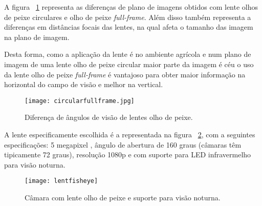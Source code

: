 A figura ~\ref{fig:circularfullframe} representa as diferenças de plano de imagens obtidos com lente olhos de peixe circulares e olho de peixe \textit{full-frame}. Além disso também representa a diferenças em distâncias focais das lentes, na qual afeta o tamanho das imagem na plano de imagem.


Desta forma, como a aplicação da lente é no ambiente agrícola e num plano de imagem de uma lente olho de peixe circular maior parte da imagem é céu o uso da lente olho de peixe \textit{full-frame} é vantajoso para obter maior informação na horizontal do campo de visão e melhor na vertical.  

\begin{figure}[h!] %
	\begin{center}
		\leavevmode		
		\texttt{[image: circularfullframe.jpg]}
		\caption{Diferença de ângulos de visão de lentes olho de peixe.}
		\label{fig:circularfullframe}
	\end{center}
\end{figure}


A lente especificamente escolhida é a representada na figura ~\ref{fig:lentfisheye}, com a seguintes especificações: 5 megapixel , ângulo de abertura de 160 graus (câmaras têm tipicamente 72 graus), resolução 1080p e com suporte para LED infravermelho para visão noturna.

\begin{figure}[h!]%
	\begin{center}
		\leavevmode		
		\texttt{[image: lentfisheye]}
		\caption{Câmara com lente olho de peixe e suporte para visão noturna.}
		\label{fig:lentfisheye}
	\end{center}
\end{figure}
